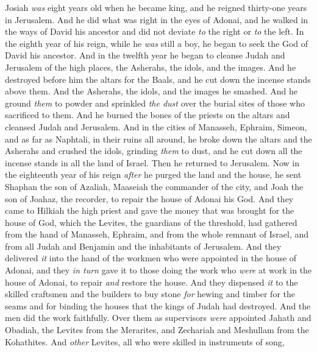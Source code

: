 \begin{biblechapter} %
 Josiah \textit{was} eight years old when he became king, and he reigned thirty-one years in Jerusalem.
\verse And he did what was right in the eyes of Adonai, and he walked in the ways of David his ancestor and did not deviate \textit{to} the right or \textit{to} the left.
\verse In the eighth year of his reign, while he \textit{was} still a boy, he began to seek the God of David his ancestor. And in the twelfth year he began to cleanse Judah and Jerusalem of the high places, the Asherahs, the idols, and the images.
\verse And he destroyed before him the altars for the Baals, and he cut down the incense stands above them. And the Asherahs, the idols, and the images he smashed. And he ground \textit{them} to powder and sprinkled \textit{the dust} over the burial sites of those who sacrificed to them.
\verse And he burned the bones of the priests on the altars and cleansed Judah and Jerusalem.
\verse And in the cities of Manasseh, Ephraim, Simeon, and as far as Naphtali, in their ruins all around,
\verse he broke down the altars and the Asherahs and crushed the idols, grinding \textit{them} to dust, and he cut down all the incense stands in all the land of Israel. Then he returned to Jerusalem.
 Now in the eighteenth year of his reign \textit{after} he purged the land and the house, he sent Shaphan the son of Azaliah, Maaseiah the commander of the city, and Joah the son of Joahaz, the recorder, to repair the house of Adonai his God.
\verse And they came to Hilkiah the high priest and gave the money that was brought for the house of God, which the Levites, the guardians of the threshold, had gathered from the hand of Manasseh, Ephraim, and from the whole remnant of Israel, and from all Judah and Benjamin and the inhabitants of Jerusalem.
\verse And they delivered \textit{it} into the hand of the workmen who were appointed in the house of Adonai, and they \textit{in turn} gave it to those doing the work who \textit{were} at work in the house of Adonai, to repair \textit{and} restore the house.
\verse And they dispensed \textit{it} to the skilled craftsmen and the builders to buy stone \textit{for} hewing and timber for the seams and for binding the houses that the kings of Judah had destroyed.
\verse And the men did the work faithfully. Over them as supervisors \textit{were} appointed Jahath and Obadiah, the Levites from the Merarites, and Zechariah and Meshullam from the Kohathites. And \textit{other} Levites, all who were skilled in instruments of song,

\end{biblechapter}
